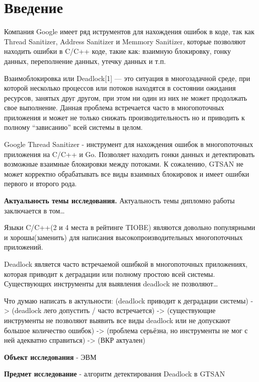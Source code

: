 
\section{Введение}

Компания Google имеет ряд иструментов для нахождения ошибок в коде, так как Thread Sanitizer, Address Sanitizer и Memmory Sanitizer, которые позволяют находить ошибки в C/C++ коде, такие как: взаимную блокировку, гонку данных, переполнение данных, утечку данных и т.п. 

Взаимоблокировка или Deadlock[1] — это ситуация в многозадачной среде, при которой несколько процессов или потоков находятся в состоянии ожидания ресурсов, занятых друг другом, при этом ни один из них не может продолжать свое выполнение. Данная проблема встречается часто в многопоточных приложения и может не только снижать производительность но и приводить к полному “зависанию” всей системы в целом.

Google Thread Sanitizer - инструмент для нахождения ошибок в многопоточных приложения на C/C++ и Go. Позволяет находить гонки данных и детектировать возможные взаимные блокировки между потоками. К сожалению, GTSAN не может корректно обрабатывать все виды взаимных блокировок и имеет ошибки первого и второго рода.

\textbf{Актуальность темы исследования.} Актуальность темы дипломно работы заключается в том\dots

Языки C/C++(2 и 4 места в рейтинге TIOBE) являются довольно популярными и хорошы(заменить) для написания высокопроизводительных многопоточных приложений. 

Deadlock является часто встречаемой ошибкой в многопоточных приложениях, которая приводит к деградации или полному простою всей системы. Существующих инструменты для выявления deadlock не позволяют\dots

Что думаю написать в актульности: (deadlock приводит к деградации системы) -> (deadlock лего допустить / часто встречается) -> (существующие инструменты не позволяют выявить все виды deadlock или не допускают большое количество ошибок) -> (проблема серьёзна, но инструменты не мог с ней адекватно справиться) -> (ВКР актуален)

\textbf{Объект исследования} - ЭВМ

\textbf{Предмет исследование} - алгоритм детектирования Deadlock в GTSAN


